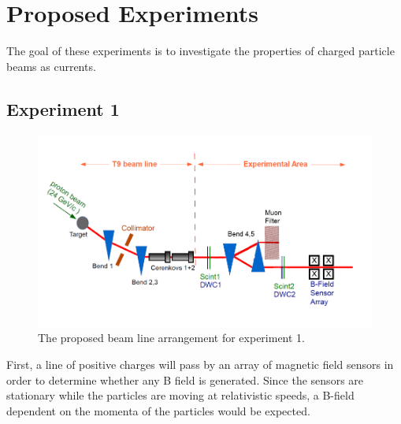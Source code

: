 \documentclass[12pt,letterpaper]{article}
\begin{document}
\section{Proposed Experiments}
The goal of these experiments is to investigate the properties of charged particle beams as currents.

\subsection{Experiment 1}
\begin{figure}[H]
\label{experiment_setup1}
  \centering
\includegraphics[]{experimental_setup1.png}
 \caption{The proposed beam line arrangement for experiment 1.}
\end{figure}
First, a line of positive charges will pass by an array of magnetic field sensors in order to determine whether any B field is generated. Since the sensors are stationary while the particles are moving at relativistic speeds, a B-field dependent on the momenta of the particles would be expected.
\end{document}
